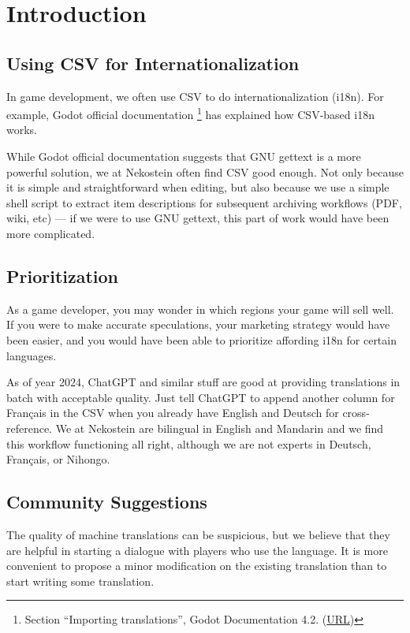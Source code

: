 \documentclass[11pt,a4paper]{report}
\begin{document}
\sffamily

\tableofcontents\clearpage





\chapter{Introduction}

\section{Using CSV for Internationalization}
In game development, we often use CSV to do internationalization (i18n).
For example, Godot official documentation
\footnote{Section ``Importing translations'', Godot Documentation 4.2.
(\href{https://docs.godotengine.org/en/stable/tutorials/assets\_pipeline/importing\_translations.html}{URL})}
has explained how CSV-based i18n works.

While Godot official documentation suggests that GNU gettext is a more powerful solution,
we at Nekostein often find CSV good enough.
Not only because it is simple and straightforward when editing,
but also because we use a simple shell script to extract
item descriptions for subsequent archiving workflows (PDF, wiki, etc) ---
if we were to use GNU gettext, this part of work would have been more complicated.

\section{Prioritization}
As a game developer, you may wonder in which regions your game will sell well.
If you were to make accurate speculations, your marketing strategy would have been easier,
and you would have been able to prioritize affording i18n for certain languages.

As of year 2024, ChatGPT and similar stuff are good at
providing translations in batch with acceptable quality.
Just tell ChatGPT to append another column for Français in the CSV
when you already have English and Deutsch for cross-reference.
We at Nekostein are bilingual in English and Mandarin
and we find this workflow functioning all right,
although we are not experts in Deutsch, Français, or Nihongo.

\section{Community Suggestions}
The quality of machine translations can be suspicious,
but we believe that they are helpful in starting a dialogue with players who use the language.
It is more convenient to propose a minor modification on the existing translation
than to start writing some translation.
\end{document}
